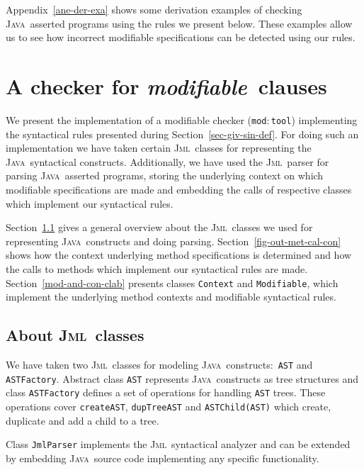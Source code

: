 \documentclass[a4paper]{llncs}
\newcommand{\jml}{\textsc{Jml}}
\newcommand{\java}{\textsc{Java}}
\newcommand{\modtool}{\texttt{mod$:$tool}}
\newcommand{\modif}{\textit{modifiable}}
\begin{document}
Appendix~\ref{ane-der-exa} shows some derivation examples of checking
\java~asserted programs using the rules we present below. These examples
allow us to see how incorrect modifiable specifications can be
detected using our rules.






\section{A checker for \modif~clauses}
\label{sec-imp-iss}
We present the implementation of a modifiable checker (\modtool)
implementing the syntactical rules presented during
Section~\ref{sec-giv-sin-def}. For doing such an implementation we
have taken certain \jml~classes for representing the \java~syntactical 
constructs. Additionally, we have used the \jml~parser for parsing
\java~asserted programs, storing the underlying context on which
modifiable specifications are made and embedding the calls of
respective classes which implement our syntactical rules.

Section~\ref{abo-jml-cla-use} gives a general overview about the
\jml~classes we used for representing \java~constructs and doing
parsing. Section~\ref{fig-out-met-cal-con} shows how the
context underlying method specifications is determined and how
the calls to methods which implement our syntactical
rules are made. Section~\ref{mod-and-con-clab} presents classes
\texttt{Context} and \texttt{Modifiable}, which implement the
underlying method contexts and modifiable syntactical rules.




\subsection{About \jml~classes}
\label{abo-jml-cla-use}
We have taken two \jml~classes for modeling \java~constructs$:$
\texttt{AST} and \texttt{ASTFactory}. Abstract class \texttt{AST}
represents \java~constructs as tree structures and class
\texttt{ASTFactory} defines a set of operations for handling
\texttt{AST} trees. These operations cover \texttt{create{AST}},
\texttt{dupTree{AST}} and \texttt{ASTChild(AST)} which create,
duplicate and add a child to a tree.

Class \texttt{JmlParser} implements the \jml~syntactical analyzer and
can be extended by embedding \java~source code implementing any
specific functionality.
\end{document}
